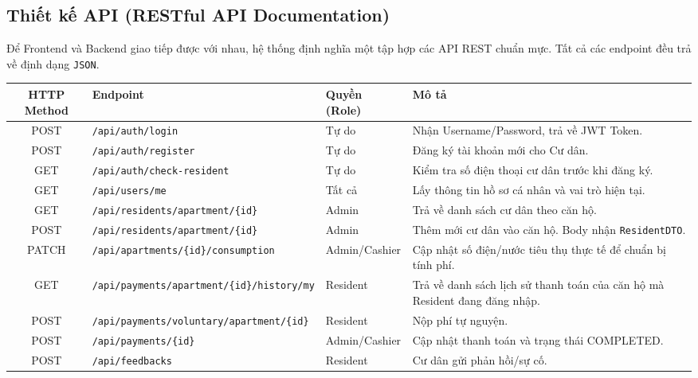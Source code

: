 \documentclass[12pt,a4paper]{article}
\begin{document}
\subsection{Thiết kế API (RESTful API Documentation)}

Để Frontend và Backend giao tiếp được với nhau, hệ thống định nghĩa một tập hợp các API REST chuẩn mực. Tất cả các endpoint đều trả về định dạng \texttt{JSON}.

\begin{table}[H]
    \centering
    \begin{tabularx}{\textwidth}{|c|L{4cm}|L{2cm}|X|}
    \hline
    \textbf{HTTP Method} & \textbf{Endpoint} & \textbf{Quyền (Role)} & \textbf{Mô tả} \\
    \hline
    POST & \texttt{/api/auth/login} & Tự do & Nhận Username/Password, trả về JWT Token. \\
    \hline
    POST & \texttt{/api/auth/register} & Tự do & Đăng ký tài khoản mới cho Cư dân. \\
    \hline
    GET & \texttt{/api/auth/check-resident} & Tự do & Kiểm tra số điện thoại cư dân trước khi đăng ký. \\
    \hline
    GET & \texttt{/api/users/me} & Tất cả & Lấy thông tin hồ sơ cá nhân và vai trò hiện tại. \\
    \hline
    GET & \texttt{/api/residents/apartment/\{id\}} & Admin & Trả về danh sách cư dân theo căn hộ. \\
    \hline
    POST & \texttt{/api/residents/apartment/\{id\}} & Admin & Thêm mới cư dân vào căn hộ. Body nhận \texttt{ResidentDTO}. \\
    \hline
    PATCH & \texttt{/api/apartments/\{id\}/consumption} & Admin/Cashier & Cập nhật số điện/nước tiêu thụ thực tế để chuẩn bị tính phí. \\
    \hline
    GET & \texttt{/api/payments/apartment/\{id\}/history/my} & Resident & Trả về danh sách lịch sử thanh toán của căn hộ mà Resident đang đăng nhập. \\
    \hline
    POST & \texttt{/api/payments/voluntary/apartment/\{id\}} & Resident & Nộp phí tự nguyện. \\
    \hline
    POST & \texttt{/api/payments/\{id\}} & Admin/Cashier & Cập nhật thanh toán và trạng thái COMPLETED. \\
    \hline
    POST & \texttt{/api/feedbacks} & Resident & Cư dân gửi phản hồi/sự cố. \\
    \hline
    \end{tabularx}
\end{table}
\end{document}
